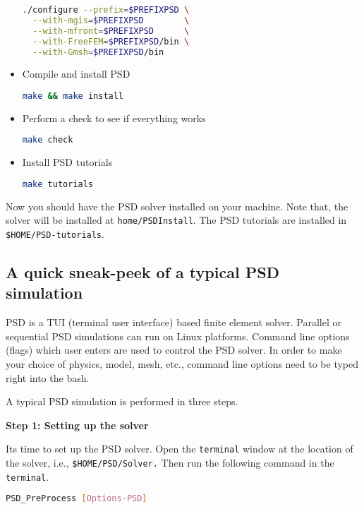 \begin{itemize}
\begin{lstlisting}[language=bash]
./configure --prefix=$PREFIXPSD \
  --with-mgis=$PREFIXPSD        \
  --with-mfront=$PREFIXPSD      \
  --with-FreeFEM=$PREFIXPSD/bin \
  --with-Gmsh=$PREFIXPSD/bin
\end{lstlisting}
\item
  Compile and install PSD

\begin{lstlisting}[language=bash]
make && make install
\end{lstlisting}
\item
  Perform a check to see if everything works

\begin{lstlisting}[language=bash]
make check
\end{lstlisting}
\item
  Install PSD tutorials

\begin{lstlisting}[language=bash]
make tutorials
\end{lstlisting}
\end{itemize}

Now you should have the PSD solver installed on your machine. Note that,
the solver will be installed at \lstinline!home/PSDInstall!. The PSD
tutorials are installed in \lstinline!$HOME/PSD-tutorials!.

\subsection{A quick sneak-peek of a typical PSD simulation}

PSD is a TUI (terminal user interface) based finite element solver.
Parallel or sequential PSD simulations can run on Linux platforms.
Command line options (flags) which user enters are used to control the
PSD solver. In order to make your choice of physics, model, mesh, etc.,
command line options need to be typed right into the bash.

A typical PSD simulation is performed in three steps.

\textbf{Step 1: Setting up the solver}

Its time to set up the PSD solver. Open the \lstinline!terminal! window
at the location of the solver, i.e., \lstinline!$HOME/PSD/Solver.! Then
run the following command in the \lstinline!terminal!.

\begin{lstlisting}[language=bash]
PSD_PreProcess [Options-PSD]
\end{lstlisting}

